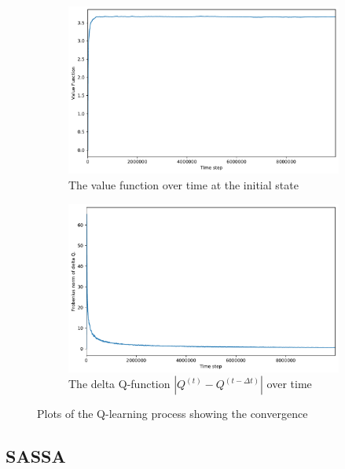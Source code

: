 \documentclass{article}
\begin{document}
\begin{figure}
  \centering
  \begin{subfigure}{\textwidth}
    \centering
    \includegraphics[width=\linewidth]{q_learn_v_fun_0.pdf}
    \caption{The value function over time at the initial state}
    \label{fig:q-learn-v0}
  \end{subfigure}

  \begin{subfigure}{\textwidth}
    \centering
    \includegraphics[width=\linewidth]{q_learn_norm_delta_q.pdf}
    \caption{The delta Q-function $|Q^{(t)} - Q^{(t-\Delta t)}|$ over time}
    \label{fig:q-learn-delta-q}
  \end{subfigure}
  \caption{Plots of the Q-learning process showing the convergence}
\end{figure}


\subsection{SASSA}
\end{document}

